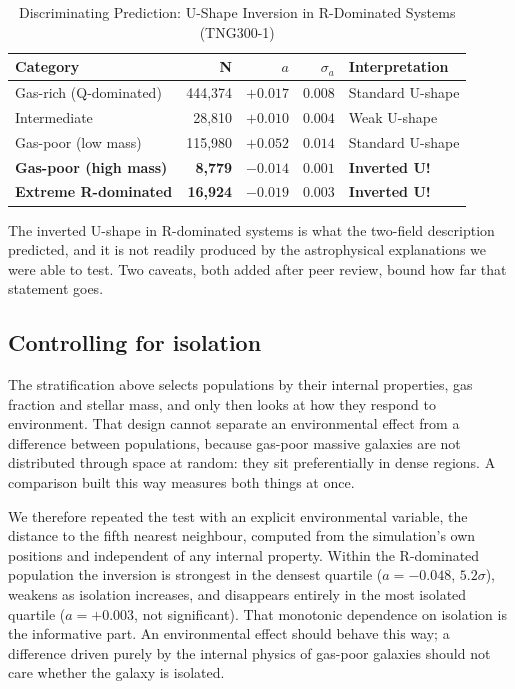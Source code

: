 \documentclass[12pt,a4paper]{article}
\begin{document}
\begin{table}[H]
\centering
\caption{Discriminating Prediction: U-Shape Inversion in R-Dominated Systems (TNG300-1)}
\label{tab:inversion}
\begin{tabular}{lrrrl}
\toprule
\textbf{Category} & \textbf{N} & \textbf{$a$} & \textbf{$\sigma_a$} & \textbf{Interpretation} \\
\midrule
Gas-rich (Q-dominated) & 444,374 & $+0.017$ & $0.008$ & Standard U-shape \\
Intermediate & 28,810 & $+0.010$ & $0.004$ & Weak U-shape \\
Gas-poor (low mass) & 115,980 & $+0.052$ & $0.014$ & Standard U-shape \\
\textbf{Gas-poor (high mass)} & \textbf{8,779} & $\mathbf{-0.014}$ & $\mathbf{0.001}$ & \textbf{Inverted U!} \\
\textbf{Extreme R-dominated} & \textbf{16,924} & $\mathbf{-0.019}$ & $\mathbf{0.003}$ & \textbf{Inverted U!} \\
\bottomrule
\end{tabular}
\end{table}

The inverted U-shape in R-dominated systems is what the two-field description predicted, and it is not readily produced by the astrophysical explanations we were able to test. Two caveats, both added after peer review, bound how far that statement goes.

\subsection{Controlling for isolation}

The stratification above selects populations by their internal properties, gas fraction and stellar mass, and only then looks at how they respond to environment. That design cannot separate an environmental effect from a difference between populations, because gas-poor massive galaxies are not distributed through space at random: they sit preferentially in dense regions. A comparison built this way measures both things at once.

We therefore repeated the test with an explicit environmental variable, the distance to the fifth nearest neighbour, computed from the simulation's own positions and independent of any internal property. Within the R-dominated population the inversion is strongest in the densest quartile ($a = -0.048$, $5.2\sigma$), weakens as isolation increases, and disappears entirely in the most isolated quartile ($a = +0.003$, not significant). That monotonic dependence on isolation is the informative part. An environmental effect should behave this way; a difference driven purely by the internal physics of gas-poor galaxies should not care whether the galaxy is isolated.
\end{document}
